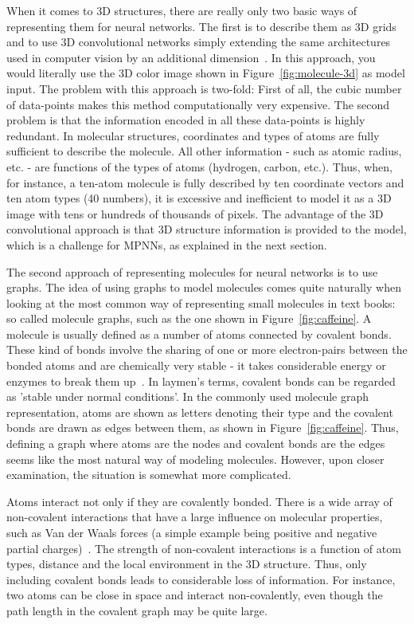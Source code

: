 When it comes to 3D structures, there are really only two basic ways of representing them for neural networks. The first is to describe them as 3D grids and to use 3D convolutional networks simply extending the same architectures used in computer vision by an additional dimension~\cite{Wallach2015}. In this approach, you would literally use the 3D color image shown in Figure~\ref{fig:molecule-3d} as model input. The problem with this approach is two-fold: First of all, the cubic number of data-points makes this method computationally very expensive. The second problem is that the information encoded in all these data-points is highly redundant. In molecular structures, coordinates and types of atoms are fully sufficient to describe the molecule. All other information - such as atomic radius, etc. - are functions of the types of atoms (hydrogen, carbon, etc.). Thus, when, for instance, a ten-atom molecule is fully described by ten coordinate vectors and ten atom types (40 numbers), it is excessive and inefficient to model it as a 3D image with tens or hundreds of thousands of pixels. The advantage of the 3D convolutional approach is that 3D structure information is provided to the model, which is a challenge for MPNNs, as explained in the next section.


The second approach of representing molecules for neural networks is to use graphs. The idea of using graphs to model molecules comes quite naturally when looking at the most common way of representing small molecules in text books: so called molecule graphs, such as the one shown in Figure~\ref{fig:caffeine}. A molecule is usually defined as a number of atoms connected by covalent bonds. These kind of bonds involve the sharing of one or more electron-pairs between the bonded atoms and are chemically very stable - it takes considerable energy or enzymes to break them up~\cite{Organic-chemistry}. In laymen's terms, covalent bonds can be regarded as 'stable under normal conditions'. In the commonly used molecule graph representation, atoms are shown as letters denoting their type and the covalent bonds are drawn as edges between them, as shown in Figure~\ref{fig:caffeine}. Thus, defining a graph where atoms are the nodes and covalent bonds are the edges seems like the most natural way of modeling molecules. However, upon closer examination, the situation is somewhat more complicated.

Atoms interact not only if they are covalently bonded. There is a wide array of non-covalent interactions that have a large influence on molecular properties, such as Van der Waals forces (a simple example being positive and negative partial charges)~\cite{Organic-chemistry}. The strength of non-covalent interactions is a function of atom types, distance and the local environment in the 3D structure. Thus, only including covalent bonds leads to considerable loss of information. For instance, two atoms can be close in space and interact non-covalently, even though the path length in the covalent graph may be quite large.

